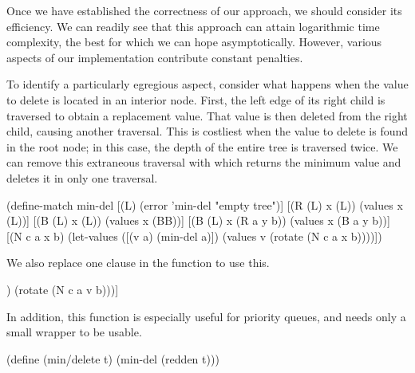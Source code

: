 \documentclass[preprint]{sigplanconf}
\begin{document}
Once we have established the correctness of our approach, we should consider its
efficiency. We can readily see that this approach can attain logarithmic time
complexity, the best for which we can hope asymptotically. However, various
aspects of our implementation contribute constant penalties.

To identify a particularly egregious aspect, consider what happens when the
value to delete is located in an interior node. First, the left edge of its
right child is traversed to obtain a replacement value. That value is then
deleted from the right child, causing another traversal. This is costliest when
the value to delete is found in the root node; in this case, the depth of the
entire tree is traversed twice. We can remove this extraneous traversal with
 which returns the minimum value and deletes it in only one
traversal.
\begin{schemedisplay}
(define-match min-del
  [(L) (error 'min-del "empty tree")]
  [(R (L) x (L)) (values x (L))]
  [(B (L) x (L)) (values x (BB))]
  [(B (L) x (R a y b)) (values x (B a y b))]
  [(N c a x b) (let-values ([(v a) (min-del a)])
                 (values v (rotate (N c a x b))))])
\end{schemedisplay}
We also replace one clause in the  function to use this.
\begin{schemedisplay}
[= (let-values ([(v b) (min-del b)])
     (rotate (N c a v b)))]
\end{schemedisplay}
In addition, this function is especially useful for priority queues, and needs
only a small wrapper to be usable.
\begin{schemedisplay}
  (define (min/delete t)
    (min-del (redden t)))
\end{schemedisplay}
\end{document}
